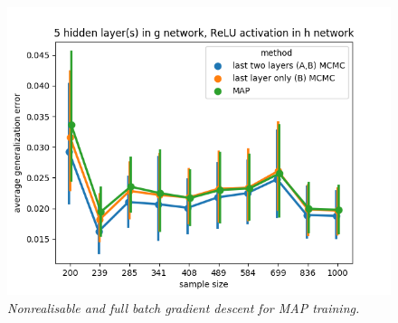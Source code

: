\documentclass[11pt]{article}
\DeclareMathOperator*{\E}{\operatorname{\mathbb{E}}}
\numberwithin{equation}{section}
\theoremstyle{plain}
\theoremstyle{definition}
\begin{document}
\begin{figure}[t!]
\begin{center}
		\includegraphics[scale=0.45]{taskid3.png}
	\end{center}
	\caption{\textit{Nonrealisable and full batch gradient descent for MAP training.}}
	\label{fig:avg_gen_err_fullbatch_nonrealisable}
\end{figure}


\begin{table}[h!]%
	\caption{Companion to Figure \ref{fig:avg_gen_err_fullbatch_nonrealisable}. The learning coefficient is the slope of the linear fit $1/n$ versus $\E_n G(n)$ (with intercept since nonrealisable).}%
	\label{table::avg_gen_err_fullbatch_nonrealisable}%
	\begin{tiny}
		\begin{subtable}[t]{.5\linewidth}
			\caption{1 hidden layer(s) in $g$, identity activation in $h$}
			
		\end{subtable}
	    \hspace{2em}
		\begin{subtable}[t]{.5\linewidth}
			\caption{5 hidden layer(s) in $g$, identity activation in $h$}		
		\end{subtable}
	
		\begin{subtable}[t]{.5\linewidth}
			\caption{1 hidden layer(s) in $g$, ReLU activation in $h$}
			
		\end{subtable}
	    \hspace{2em}
		\begin{subtable}[t]{.5\linewidth}
			\caption{5 hidden layer(s) in $g$, ReLU activation in $h$}		
		\end{subtable}
	\end{tiny}
\end{table}
\end{document}
